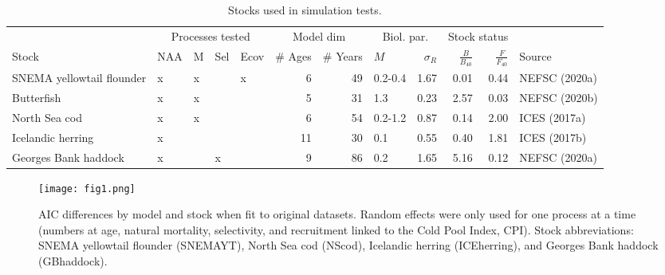 \documentclass[]{article}
\begin{document}
\begin{landscape}
\begin{table}

\caption{\label{tab:stock-list}Stocks used in simulation tests.}
\centering
\begin{tabular}[t]{lllllrrlrrrl}
\toprule
\multicolumn{1}{c}{ } & \multicolumn{4}{c}{Processes tested} & \multicolumn{2}{c}{Model dim} & \multicolumn{2}{c}{Biol. par.} & \multicolumn{2}{c}{Stock status} \\
\cmidrule(l{3pt}r{3pt}){2-5} \cmidrule(l{3pt}r{3pt}){6-7} \cmidrule(l{3pt}r{3pt}){8-9} \cmidrule(l{3pt}r{3pt}){10-11}
Stock & NAA & M & Sel & Ecov & \# Ages & \# Years & $M$ & $\sigma_R$ & $\frac{B}{B_{40}}$ & $\frac{F}{F_{40}}$ & Source\\
\midrule
SNEMA yellowtail flounder & x & x &  & x & 6 & 49 & 0.2-0.4 & 1.67 & 0.01 & 0.44 & NEFSC (2020a)\\
Butterfish & x & x &  &  & 5 & 31 & 1.3 & 0.23 & 2.57 & 0.03 & NEFSC (2020b)\\
North Sea cod & x & x &  &  & 6 & 54 & 0.2-1.2 & 0.87 & 0.14 & 2.00 & ICES (2017a)\\
Icelandic herring & x &  &  &  & 11 & 30 & 0.1 & 0.55 & 0.40 & 1.81 & ICES (2017b)\\
Georges Bank haddock & x &  & x &  & 9 & 86 & 0.2 & 1.65 & 5.16 & 0.12 & NEFSC (2020a)\\
\bottomrule
\end{tabular}
\end{table}
\end{landscape}

\pagebreak

\begin{landscape}
\begin{figure}

{\centering \texttt{[image: fig1.png]} 

}

\caption{AIC differences by model and stock when fit to original datasets. Random effects were only used for one process at a time (numbers at age, natural mortality, selectivity, and recruitment linked to the Cold Pool Index, CPI). Stock abbreviations: SNEMA yellowtail flounder (SNEMAYT), North Sea cod (NScod), Icelandic herring (ICEherring), and Georges Bank haddock (GBhaddock).}\label{fig:daic}
\end{figure}
\end{landscape}

\pagebreak
\end{document}
